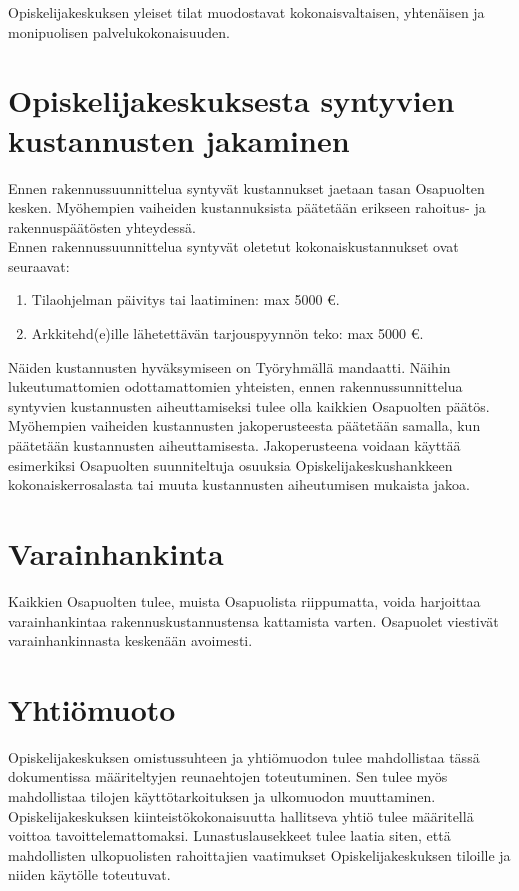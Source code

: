 \documentclass[a4paper, 12pt, finnish]{report}
\begin{document}
Opiskelijakeskuksen yleiset tilat muodostavat kokonaisvaltaisen, yhtenäisen ja monipuolisen palvelukokonaisuuden.


\section*{Opiskelijakeskuksesta syntyvien kustannusten jakaminen}
Ennen rakennussuunnittelua syntyvät kustannukset jaetaan tasan Osapuolten kesken. Myöhempien vaiheiden kustannuksista päätetään erikseen rahoitus- ja rakennuspäätösten yhteydessä.\\

Ennen rakennussuunnittelua syntyvät oletetut kokonaiskustannukset ovat seuraavat:

\begin{enumerate}
    \item Tilaohjelman päivitys tai laatiminen: max 5000 \euro{}.
    \item Arkkitehd(e)ille lähetettävän tarjouspyynnön teko: max 5000 \euro{}.
\end{enumerate}

Näiden kustannusten hyväksymiseen on Työryhmällä mandaatti.
Näihin lukeutumattomien odottamattomien yhteisten, ennen rakennussunnittelua syntyvien kustannusten aiheuttamiseksi tulee olla kaikkien Osapuolten päätös.\\

Myöhempien vaiheiden kustannusten jakoperusteesta päätetään samalla, kun päätetään kustannusten aiheuttamisesta.
Jakoperusteena voidaan käyttää esimerkiksi Osapuolten suunniteltuja osuuksia Opiskelijakeskushankkeen kokonaiskerrosalasta tai muuta kustannusten aiheutumisen mukaista jakoa.


\section*{Varainhankinta}
Kaikkien Osapuolten tulee, muista Osapuolista riippumatta, voida harjoittaa varainhankintaa rakennuskustannustensa kattamista varten.
Osapuolet viestivät varainhankinnasta keskenään avoimesti.


\section*{Yhtiömuoto}
Opiskelijakeskuksen omistussuhteen ja yhtiömuodon tulee mahdollistaa tässä dokumentissa määriteltyjen reunaehtojen toteutuminen.
Sen tulee myös mahdollistaa tilojen käyttötarkoituksen ja ulkomuodon muuttaminen.
Opiskelijakeskuksen kiinteistökokonaisuutta hallitseva yhtiö tulee määritellä voittoa tavoittelemattomaksi.
Lunastuslausekkeet tulee laatia siten, että mahdollisten ulkopuolisten rahoittajien vaatimukset Opiskelijakeskuksen tiloille ja niiden käytölle toteutuvat.\\
\end{document}
